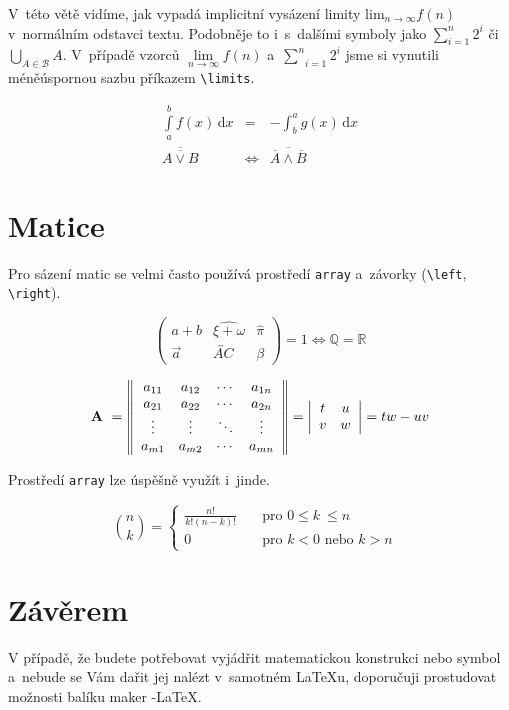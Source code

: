 \documentclass[a4paper,11pt,twocolumn]{article}
\theoremstyle{definition}
\theoremstyle{definition}
\theoremstyle{definition}
\begin{document}
V~této větě vidíme, jak vypadá implicitní vysázení limity $\mathrm{lim}_{n \rightarrow \infty}f(n)$ v~normálním odstavci textu. Podobně\linebreak je to i~s~dalšími symboly jako $\sum_{i=1}^n 2^i$ či $\bigcup_{A \in \mathcal{B}}A$.
V~případě vzorců $\textstyle\lim\limits_{n \to \infty} f(n)$ a~$\underset{i = 1}{\overset{n}\sum}2^i $ jsme si vynutili méně\linebreak úspornou sazbu příkazem \verb|\limits|.

\begin{eqnarray}
\displaystyle \int \limits^b_a f(x)\, \mathrm{d}x &=&-\displaystyle\int^a_b g(x)\, \mathrm{d}x  \\
\overline{\overline{A \vee B}} &\Leftrightarrow& \overline{\overline{A} \wedge \overline{B}}
\end{eqnarray}

\section{Matice}

Pro sázení matic se velmi často používá prostředí \texttt{array} a~závorky (\verb|\left|, \verb|\right|).

$$\left( \begin{array}{ccc}
a+b & \widehat{\xi + \omega} & \hat{\pi}\\
\vec{a} & \overleftrightarrow{AC} & \beta
\end{array} \right) = 1 \Longleftrightarrow \mathbb{Q} = \mathbb{R} $$

$$ {\textbf A}~= \left\| \begin{array}{cccc}
a_{11} & a_{12} & \cdots & a_{1n} \\
a_{21} & a_{22} & \cdots & a_{2n} \\
\vdots & \vdots & \ddots & \vdots \\
a_{m1} & a_{m2} & \cdots & a_{mn} \end{array} \right\| = \left| \begin{array}{cc}
t & u \\
v & w \\
\end{array} \right|
= tw-uv $$

Prostředí \texttt{array} lze úspěšně využít i~jinde.

$${n\choose k} = \left\{ \begin{array}{ll}
\frac{n!}{k!(n-k)!} & \quad \mbox{pro $0 \leq k~\leq n$ } \\
0 & \quad \mbox{pro $k<0$ nebo $k>n$ } \end{array} \right.$$

\section{Závěrem}
V případě, že budete potřebovat vyjádřit matematickou konstrukci nebo symbol a~nebude se Vám dařit jej nalézt v~samotném \LaTeX u, doporučuji prostudovat možnosti balíku maker \AmS-\LaTeX.
\end{document}
